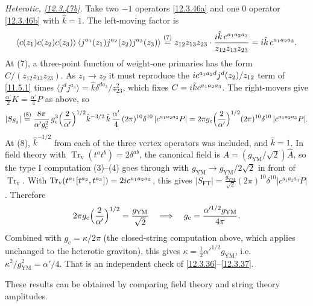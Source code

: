 \begin{tcolorbox}[breakable]
\begin{remark}
		\emph{Heterotic, \eqref{12.3.47b}.} Take two $-1$ operators \eqref{12.3.46a} and one $0$ operator \eqref{12.3.46b} with $\hat k=1$. The left-moving factor is
		\begin{align*}
			\langle c(z_{1})c(z_{2})c(z_{3})\rangle\,\langle j^{a_{1}}(z_{1})j^{a_{2}}(z_{2})j^{a_{3}}(z_{3})\rangle
			\overset{(7)}{=} z_{12}z_{13}z_{23}\cdot\frac{i\hat k\,c^{a_{1}a_{2}a_{3}}}{z_{12}z_{13}z_{23}}=i\hat k\,c^{a_{1}a_{2}a_{3}} .
		\end{align*}
		At (7), a three-point function of weight-one primaries has the form $C/(z_{12}z_{13}z_{23})$. As $z_{1}\to z_{2}$ it must reproduce the $i c^{a_{1}a_{2}d}j^{d}(z_{2})/z_{12}$ term of \eqref{11.5.1} times $\langle j^{d}j^{a_{3}}\rangle=\hat k\delta^{da_{3}}/z_{23}^{2}$, which fixes $C=i\hat kc^{a_{1}a_{2}a_{3}}$. The right-movers give $\frac{\alpha'}{2}K=\frac{\alpha'}{4}P$ as above, so
		\begin{align*}
			\lvert S_{S_{2}}\rvert\overset{(8)}{=} \frac{8\pi}{\alpha'g_{\mathrm c}^{2}}\,g_{\mathrm c}^{3}\Bigl(\frac{2}{\alpha'}\Bigr)^{1/2}\hat k^{-3/2}\,\hat k\,\frac{\alpha'}{4}\,(2\pi)^{10}\delta^{10}\,\lvert c^{a_{1}a_{2}a_{3}}P\rvert
			=2\pi g_{\mathrm c}\Bigl(\frac{2}{\alpha'}\Bigr)^{1/2}(2\pi)^{10}\delta^{10}\,\lvert c^{a_{1}a_{2}a_{3}}P\rvert .
		\end{align*}
		At (8), $\hat k^{-1/2}$ from each of the three vertex operators was included, and $\hat k=1$. In field theory with $\operatorname{Tr}_{\mathrm v}(t^{a}t^{b})=2\delta^{ab}$, the canonical field is $A=(g_{\mathrm{YM}}/\sqrt2)\hat A$, so the type I computation (3)--(4) goes through with $g_{\mathrm{YM}}\to g_{\mathrm{YM}}/2\sqrt2$ in front of $\operatorname{Tr}_{\mathrm v}$. With $\operatorname{Tr}_{\mathrm v}(t^{a_{1}}[t^{a_{2}},t^{a_{3}}])=2i c^{a_{1}a_{2}a_{3}}$, this gives $\lvert S_{\text{FT}}\rvert=\frac{g_{\mathrm{YM}}}{\sqrt2}(2\pi)^{10}\delta^{10}\lvert c^{a_{1}a_{2}a_{3}}P\rvert$. Therefore
		\[
		2\pi g_{\mathrm c}\Bigl(\frac{2}{\alpha'}\Bigr)^{1/2}=\frac{g_{\mathrm{YM}}}{\sqrt2}\quad\Longrightarrow\quad g_{\mathrm c}=\frac{\alpha'^{1/2}g_{\mathrm{YM}}}{4\pi} .
		\]
		Combined with $g_{\mathrm c}=\kappa/2\pi$ (the closed-string computation above, which applies unchanged to the heterotic graviton), this gives $\kappa=\frac12\alpha'^{1/2}g_{\mathrm{YM}}$, i.e.\ $\kappa^{2}/g^{2}_{\mathrm{YM}}=\alpha'/4$. That is an independent check of \eqref{12.3.36}--\eqref{12.3.37}.
	\end{remark}
\end{tcolorbox}
These results can be obtained by comparing field theory and string theory amplitudes. 

